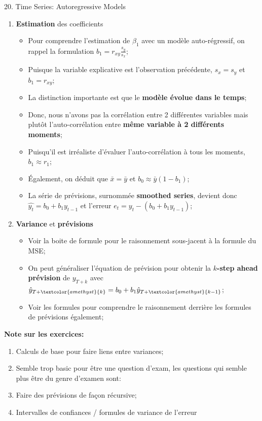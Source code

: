 \documentclass[12pt, titlepage, french]{report}
\begin{document}
\begin{CHPT_SUMM}[label = {timeseries20}]{20. Time Series: Autoregressive Models}
\begin{enumerate}
\begin{itemize}
\begin{align*}
		\end{align*}
		\setlength{\mathindent}{1cm}
		\end{itemize}
	\item[]	\textbf{Estimation} des coefficients
		\begin{itemize}
		\item	Pour comprendre l'estimation de $\beta_{1}$ avec un modèle auto-régressif, on rappel la formulation $b_{1} = r_{xy} \frac{s_{y}}{s_{x}}$;
		\item[]	Puisque la variable explicative est l'observation précédente, $s_{x} = s_{y}$ et $b_{1} = r_{xy}$;
		\item[]	La distinction importante est que le \textbf{modèle évolue dans le temps};
		\item[] Donc, nous n'avons pas la corrélation entre 2 différentes variables mais plutôt l'auto-corrélation entre \textbf{même variable à 2 différents moments};
		\item	Puisqu'il est irréaliste d'évaluer l'auto-corrélation à tous les moments, $b_{1} \approx r_{1}$;
		\item	Également, on déduit que $\bar{x} = \bar{y}$ et $b_{0} \approx \bar{y} (1 - b_{1})$;
		\item	La série de prévisions, surnommée \textbf{smoothed series}, devient donc $\hat{y_{t}} = b_{0} + b_{1} y_{t - 1}$ et l'erreur $e_{t} = y_{t} - (b_{0} + b_{1} y_{t - 1})$;
		\end{itemize}
	\item[]	\textbf{Variance} et \textbf{prévisions}
		\begin{itemize}
		\item	Voir la boite de formule pour le raisonnement sous-jacent à la formule du MSE;
		\item	On peut généraliser l'équation de prévision pour obtenir la \textbf{\textcolor{amethyst}{$k$-step ahead} prévision} de $y_{T + k}$ avec $\hat{y}_{T + \textcolor{amethyst}{k}} = b_{0} + b_{1} \hat{y}_{T + \textcolor{amethyst}{k - 1}}$;
		\item	Voir les formules pour comprendre le raisonnement derrière les formules de prévisions également;
		\end{itemize}
\end{enumerate}
\textbf{Note sur les exercices:} 
\begin{enumerate}
	\item	Calculs de base pour faire liens entre variances;
	\item[]	Semble trop basic pour être une question d'exam, les questions qui semble plus être du genre d'examen sont:
	\item	Faire des prévisions de façon récursive;
	\item	Intervalles de confiances / formules de variance de l'erreur	
\end{enumerate}
\end{CHPT_SUMM}
\end{document}
